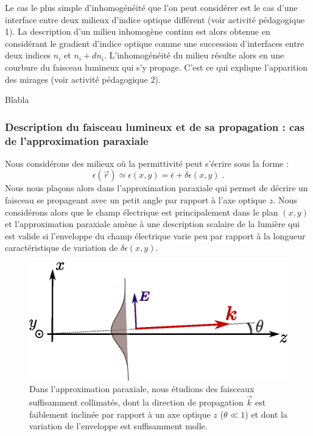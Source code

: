 \documentclass[a4paper,11pt]{article} %
\newenvironment{encart}[1]{%
	\begin{tcolorbox}
		[
		breakable, enhanced jigsaw, %
		arc = 1mm, %
		title = \textbf{#1}, %
		coltitle = white, %
		colbacktitle = blue, %
		colback = white, %
		colframe = blue %
		]
}{		
	\end{tcolorbox}
}
\begin{document}
	Le cas le plus simple d'inhomogénéité que l'on peut considérer est le cas d'une interface entre deux milieux d'indice optique différent (voir activité pédagogique 1). La description d'un milieu inhomogène continu est alors obtenue en considérant le gradient d'indice optique comme une succession d'interfaces entre deux indices $ n_i $ et $ n_i + dn_i $. L'inhomogénéité du milieu résulte alors en une courbure du faisceau lumineux qui s'y propage. C'est ce qui explique l'apparition des mirages (voir activité pédagogique 2).
	
	\begin{encart}{Activité pédagogique : étude documentaire d'un mirage}
		Blabla
	\end{encart}
	
	\subsubsection{Description du faisceau lumineux et de sa propagation : cas de l'approximation paraxiale}
	
	Nous considérons des milieux où la permittivité peut s'écrire sous la forme :
	\begin{equation*}
		\epsilon(\vec{r}) \simeq \epsilon(x,y) = \bar{\epsilon} + \delta \epsilon(x,y) \; .
	\end{equation*}
	Nous nous plaçons alors dans l'approximation paraxiale qui permet de décrire un faisceau se propageant avec un petit angle par rapport à l'axe optique $z$. Nous considérons alors que le champ électrique est principalement dans le plan $(x,y)$ et l'approximation paraxiale amène à une description scalaire de la lumière qui est valide si l'enveloppe du champ électrique varie peu par rapport à la longueur caractéristique de variation de $\delta \epsilon (x,y)$. 
	
	\begin{figure}[h]
		\centering
		\begin{minipage}[c]{0.85\linewidth}
			\centering
			\includegraphics[width=0.65\linewidth]{./Illustrations/schema_paraxial}
			\caption{Dans l'approximation paraxiale, nous étudions des faisceaux suffisamment collimatés, dont la direction de propagation $ \vec{k} $ est faiblement inclinée par rapport à un axe optique $ z $ ($ \theta \ll 1 $) et dont la variation de l'enveloppe est suffisamment molle.}
			\label{fig:schema_paraxial}
		\end{minipage}
	\end{figure}
	
\end{document}
